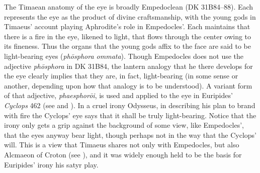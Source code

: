 The Timaean anatomy of the eye is broadly Empedoclean (DK 31B84--88). Each represents the eye as the product of divine craftsmanship, with the young gods in Timaeus' account playing Aphrodite's role in Empedocles'. Each maintains that there is a fire in the eye, likened to light, that flows through the center owing to its fineness. Thus the organs that the young gods affix to the face are said to be light-bearing eyes (\emph{phōsphora ommata}). Though Empedocles does not use the adjective \emph{phōsphora} in DK 31B84, the lantern analogy that he there develops for the eye clearly implies that they are, in fact, light-bearing (in some sense or another, depending upon how that analogy is to be understood). A variant form of that adjective, \emph{phaesphorōi}, is used and applied to the eye in Euripides' \emph{Cyclops} 462 (see \citealt[489-90]{Seaford:1984vb} and \citealt[114]{Johansen:2004dx}). In a cruel irony Odysseus, in describing his plan to brand with fire the Cyclops' eye says that it shall be truly light-bearing. Notice that the irony only gets a grip against the background of some view, like Empedocles', that the eyes anyway bear light, though perhaps not in the way that the Cyclops' will. This is a view that Timaeus shares not only with Empedocles, but also Alcmaeon of Croton (see \citealt[11--13]{Beare:1906uq}), and it was widely enough held to be the basis for Euripides' irony his satyr play.

